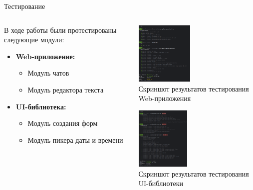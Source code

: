 \documentclass[aspectratio=169]{beamer}
\begin{document}
\begin{frame}{Тестирование}
\small
\justifying

\begin{columns}
  \begin{column}{0.45\textwidth}
    В ходе работы были протестированы следующие модули:
    \begin{itemize}
      \item \textbf{Web-приложение:}
      \begin{itemize}
        \item Модуль чатов
        \item Модуль редактора текста
      \end{itemize}
      \item \textbf{UI-библиотека:}
      \begin{itemize}
        \item Модуль создания форм
        \item Модуль пикера даты и времени
      \end{itemize}
    \end{itemize}
  \end{column}

  \begin{column}{0.55\textwidth}
    \centering
    \includegraphics[height=3cm]{static/ProjectTests.png} \\
    \scriptsize Скриншот результатов тестирования Web-приложения

    \vspace{1em} %

    \includegraphics[height=3cm]{static/LibTests.png} \\
    \scriptsize Скриншот результатов тестирования UI-библиотеки
  \end{column}
\end{columns}
\end{frame}
\end{document}
